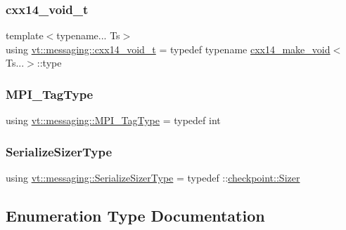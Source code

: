 \subsubsection{\texorpdfstring{cxx14\+\_\+void\+\_\+t}{cxx14\_void\_t}}
{\footnotesize\ttfamily template$<$typename... Ts$>$ \\
using \hyperlink{namespacevt_1_1messaging_a9724e719b301289eb8b3afbf9c44cf46}{vt\+::messaging\+::cxx14\+\_\+void\+\_\+t} = typedef typename \hyperlink{structvt_1_1messaging_1_1cxx14__make__void}{cxx14\+\_\+make\+\_\+void}$<$Ts...$>$\+::type}

\mbox{\label{namespacevt_1_1messaging_af700cb74b7b97c1a305267a9eb3ba91a}} 
\subsubsection{\texorpdfstring{M\+P\+I\+\_\+\+Tag\+Type}{MPI\_TagType}}
{\footnotesize\ttfamily using \hyperlink{namespacevt_1_1messaging_af700cb74b7b97c1a305267a9eb3ba91a}{vt\+::messaging\+::\+M\+P\+I\+\_\+\+Tag\+Type} = typedef int}

\mbox{\label{namespacevt_1_1messaging_ad46de1ccda6ed95e8bb11e85c28be878}} 
\subsubsection{\texorpdfstring{Serialize\+Sizer\+Type}{SerializeSizerType}}
{\footnotesize\ttfamily using \hyperlink{namespacevt_1_1messaging_ad46de1ccda6ed95e8bb11e85c28be878}{vt\+::messaging\+::\+Serialize\+Sizer\+Type} = typedef \+::\hyperlink{structcheckpoint_1_1_sizer}{checkpoint\+::\+Sizer}}



\subsection{Enumeration Type Documentation}
\mbox{\label{namespacevt_1_1messaging_a6508ef3a4701a2e6fd0bfe3edcc63a6c}} 

